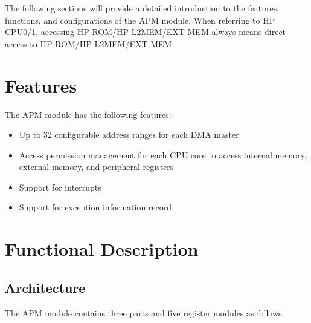 \documentclass[main\_\_EN.tex]{subfiles}
\begin{document}
The following sections will provide a detailed introduction to the features, functions, and configurations of the APM module. When referring to HP CPU0/1, accessing HP ROM/HP L2MEM/EXT MEM always means direct access to HP ROM/HP L2MEM/EXT MEM.


\section{Features}

The APM module has the following features:

\begin{itemize}
    \item Up to 32 configurable address ranges for each DMA master
    \item Access permission management for each CPU core to access internal memory, external memory, and peripheral registers
    \item Support for interrupts
    \item Support for exception information record
\end{itemize}

\section{Functional Description}

\subsection{Architecture}

The APM module contains three parts and five register modules as follows:
\end{document}
